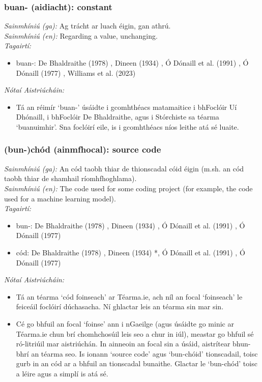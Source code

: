 \subsubsection*{buan- (aidiacht): constant}
 \noindent \textit{Sainmhíniú (ga):} Ag trácht ar luach éigin, gan athrú.
\\
 \noindent \textit{Sainmhíniú (en):} Regarding a value, unchanging.
\\
 \noindent \textit{Tagairtí:}
\begin{itemize}
	\item buan-: De Bhaldraithe (1978) \cite{de-bhaldraithe}, Dineen (1934) \cite{dineen}, Ó Dónaill et al. (1991) \cite{focloir-beag}, Ó Dónaill (1977) \cite{odonaill}, Williams et al. (2023) \cite{storchiste}
\end{itemize}

 \noindent \textit{Nótaí Aistriúcháin:}
\begin{itemize}
	\item Tá an réimír `buan-' úsáidte i gcomhthéacs matamaitice i bhFoclóir Uí Dhónaill, i bhFoclóir De Bhaldraithe, agus i Stórchiste sa téarma `buanuimhir'. Sna foclóirí eile, is i gcomhthéacs níos leithe atá sé luaite.
\end{itemize}


\subsubsection*{(bun-)chód (ainmfhocal): source code}
 \noindent \textit{Sainmhíniú (ga):} An cód taobh thiar de thionscadal cóid éigin (m.sh. an cód taobh thiar de shamhail ríomhfhoghlama).
\\
 \noindent \textit{Sainmhíniú (en):} The code used for some coding project (for example, the code used for a machine learning model).
\\
 \noindent \textit{Tagairtí:}
\begin{itemize}
	\item bun-: De Bhaldraithe (1978) \cite{de-bhaldraithe}, Dineen (1934) \cite{dineen}, Ó Dónaill et al. (1991) \cite{focloir-beag}, Ó Dónaill (1977) \cite{odonaill}
	\item cód: De Bhaldraithe (1978) \cite{de-bhaldraithe}, Dineen (1934) \cite{dineen}*, Ó Dónaill et al. (1991) \cite{focloir-beag}, Ó Dónaill (1977) \cite{odonaill}
\end{itemize}

 \noindent \textit{Nótaí Aistriúcháin:}
\begin{itemize}
	\item Tá an téarma `cód foinseach' ar Téarma.ie, ach níl an focal `foinseach' le feiceáil foclóirí dúchasacha. Ní ghlactar leis an téarma sin mar sin.
	\item Cé go bhfuil an focal `foinse' ann i nGaeilge (agus úsáidte go minic ar Téarma.ie chun brí chomhchosúil leis seo a chur in iúl), meastar go bhfuil sé ró-litriúil mar aistriúchán. In ainneoin an focal sin a úsáid, aistrítear bhun-bhrí an téarma seo. Is ionann `source code' agus `bun-chóid' tionscadail, toisc gurb in an cód ar a bhfuil an tionscadal bunaithe. Glactar le `bun-chód' toisc a léire agus a simplí is atá sé.
\end{itemize}


